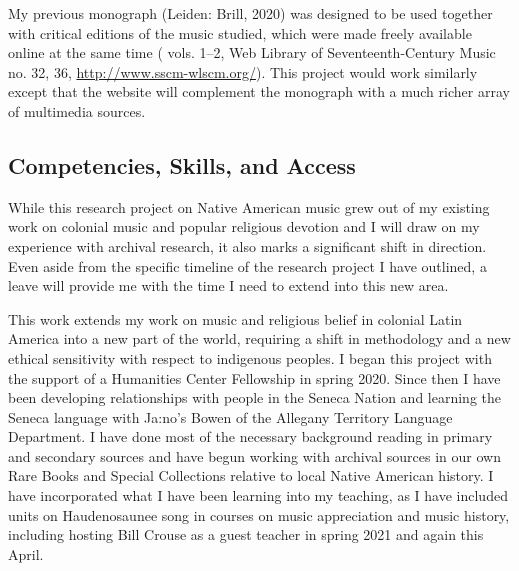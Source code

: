 \documentclass{neh}
\begin{document}
My previous monograph  (Leiden: Brill, 2020) was
designed to be used together with critical editions of the music
studied, which were made freely available online at the same time
( vols. 1--2, Web Library of
Seventeenth-Century Music no. 32, 36, \url{http://www.sscm-wlscm.org/}).
This project would work similarly except that the website will complement the
monograph with a much richer array of multimedia sources.


\subsection{Competencies, Skills, and Access}


While this research project on Native American music grew out of my existing
work on colonial music and popular religious devotion and I will draw on my
experience with archival research, it also marks a significant shift in
direction.
Even aside from the specific timeline of the research project I have outlined,
a leave will provide me with the time I need to extend into this new area.

This work extends my work on music and religious belief in colonial Latin
America into a new part of the world, requiring a shift in methodology and a
new ethical sensitivity with respect to indigenous peoples.
I began this project with the support of a Humanities Center Fellowship in
spring 2020. 
Since then I have been developing relationships with people in the Seneca
Nation and learning the Seneca language with Ja:no's Bowen of the Allegany
Territory Language Department.
I have done most of the necessary background reading in primary and secondary
sources and have begun working with archival sources in our own Rare Books and
Special Collections relative to local Native American history.
I have incorporated what I have been learning into my teaching, as I have
included units on Haudenosaunee song in courses on music appreciation and
music history, including hosting Bill Crouse as a guest teacher in spring 2021
and again this April.
\end{document}

